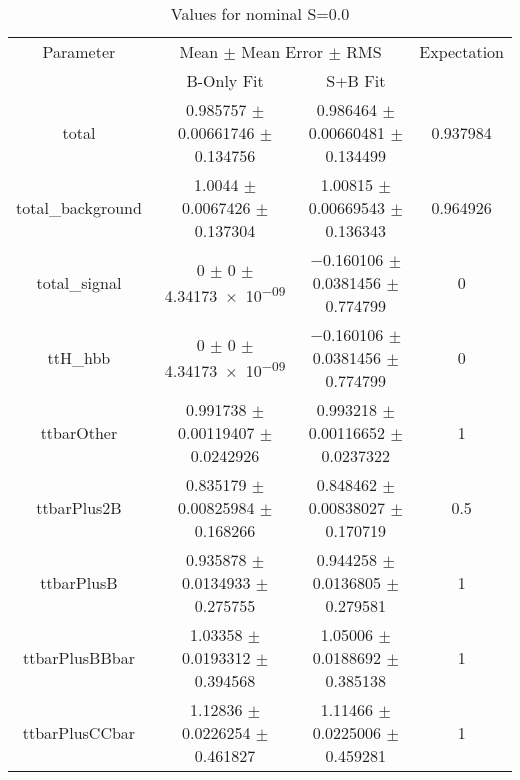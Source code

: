 \begin{table}
\centering
\caption{Values for nominal S=0.0}
\begin{tabular}{cccc}
\toprule
Parameter & \multicolumn{2}{c}{Mean $\pm$ Mean Error $\pm$ RMS} & Expectation\\
 & B-Only Fit & S+B Fit & \\
\midrule
total & \num{0.985757} $\pm$ \num{0.00661746} $\pm$ \num{0.134756} & \num{0.986464} $\pm$ \num{0.00660481} $\pm$ \num{0.134499} & \num{0.937984}\\
total\_background & \num{1.0044} $\pm$ \num{0.0067426} $\pm$ \num{0.137304} & \num{1.00815} $\pm$ \num{0.00669543} $\pm$ \num{0.136343} & \num{0.964926}\\
total\_signal & \num{0} $\pm$ \num{0} $\pm$ \num{4.34173e-09} & \num{-0.160106} $\pm$ \num{0.0381456} $\pm$ \num{0.774799} & \num{0}\\
ttH\_hbb & \num{0} $\pm$ \num{0} $\pm$ \num{4.34173e-09} & \num{-0.160106} $\pm$ \num{0.0381456} $\pm$ \num{0.774799} & \num{0}\\
ttbarOther & \num{0.991738} $\pm$ \num{0.00119407} $\pm$ \num{0.0242926} & \num{0.993218} $\pm$ \num{0.00116652} $\pm$ \num{0.0237322} & \num{1}\\
ttbarPlus2B & \num{0.835179} $\pm$ \num{0.00825984} $\pm$ \num{0.168266} & \num{0.848462} $\pm$ \num{0.00838027} $\pm$ \num{0.170719} & \num{0.5}\\
ttbarPlusB & \num{0.935878} $\pm$ \num{0.0134933} $\pm$ \num{0.275755} & \num{0.944258} $\pm$ \num{0.0136805} $\pm$ \num{0.279581} & \num{1}\\
ttbarPlusBBbar & \num{1.03358} $\pm$ \num{0.0193312} $\pm$ \num{0.394568} & \num{1.05006} $\pm$ \num{0.0188692} $\pm$ \num{0.385138} & \num{1}\\
ttbarPlusCCbar & \num{1.12836} $\pm$ \num{0.0226254} $\pm$ \num{0.461827} & \num{1.11466} $\pm$ \num{0.0225006} $\pm$ \num{0.459281} & \num{1}\\
\bottomrule
\end{tabular}
\end{table}